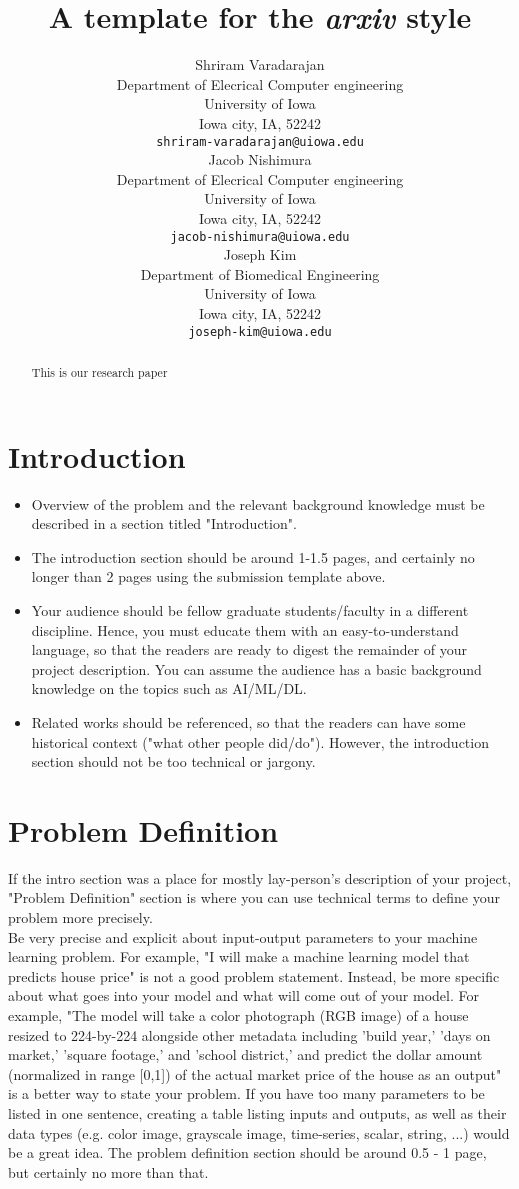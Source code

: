 \documentclass{article}
\title{A template for the \emph{arxiv} style}
\author{
  Shriram Varadarajan \\
  Department of Elecrical Computer engineering\\
  University of Iowa\\
  Iowa city, IA, 52242 \\
  \texttt{shriram-varadarajan@uiowa.edu} \\
   \And
 Jacob Nishimura \\
  Department of Elecrical Computer engineering\\
  University of Iowa\\
  Iowa city, IA, 52242 \\
  \texttt{jacob-nishimura@uiowa.edu} \\
\And
Joseph Kim \\
  Department of Biomedical Engineering\\
  University of Iowa\\
  Iowa city, IA, 52242 \\
  \texttt{joseph-kim@uiowa.edu} \\
}
\begin{document}
\maketitle

\begin{abstract}
This is our research paper 
\end{abstract}




\section{Introduction}
\begin{itemize}
\item Overview of the problem and the relevant background knowledge must be described in a section titled "Introduction". 
\item The introduction section should be around 1-1.5 pages, and certainly no longer than 2 pages using the submission template above.
\item Your audience should be fellow graduate students/faculty in a different discipline. Hence, you must educate them with an easy-to-understand language, so that the readers are ready to digest the remainder of your project description. You can assume the audience has a basic background knowledge on the topics such as AI/ML/DL. 
\item Related works should be referenced, so that the readers can have some historical context ("what other people did/do"). However, the introduction section should not be too technical or jargony.
\end{itemize}


\section{Problem Definition}
\label{sec:pb}
If the intro section was a place for mostly lay-person's description of your project, "Problem Definition" section is where you can use technical terms to define your problem more precisely.\\
Be very precise and explicit about input-output parameters to your machine learning problem. For example, "I will make a machine learning model that predicts house price"  is not a good problem statement. Instead, be more specific about what goes into your model and what will come out of your model. For example, "The model will take a color photograph (RGB image) of a house resized to 224-by-224 alongside other metadata including 'build year,' 'days on market,' 'square footage,' and 'school district,' and predict the dollar amount (normalized in range [0,1]) of the actual market price of the house as an output" is a better way to state your problem. If you have too many parameters to be listed in one sentence, creating a table listing inputs and outputs, as well as their data types (e.g. color image, grayscale image, time-series, scalar, string, ...) would be a great idea.
The problem definition section should be around 0.5 - 1 page, but certainly no more than that.\\
\end{document}
